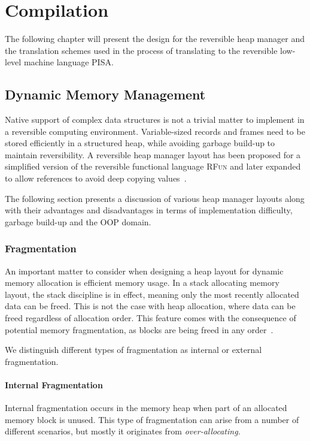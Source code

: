 \chapter{Compilation}
\label{chp:compilation}
The following chapter will present the design for the reversible heap manager and the translation schemes used in the process of translating \rooplpp to the reversible low-level machine language \textsc{PISA}.

\section{Dynamic Memory Management}
\label{sec:dynamic-memory-management}
Native support of complex data structures is not a trivial matter to implement in a reversible computing environment. Variable-sized records and frames need to be stored efficiently in a structured heap, while avoiding garbage build-up to maintain reversibility. A reversible heap manager layout has been proposed for a simplified version of the reversible functional language \textsc{RFun} and later expanded to allow references to avoid deep copying values~\cite{ha:heap, ty:rfun, tm:refcounting}.

The following section presents a discussion of various heap manager layouts along with their advantages and disadvantages in terms of implementation difficulty, garbage build-up and the OOP domain. 

\subsection{Fragmentation}
\label{subsec-fragmentation}
An important matter to consider when designing a heap layout for dynamic memory allocation is efficient memory usage. In a stack allocating memory layout, the stack discipline is in effect, meaning only the most recently allocated data can be freed. This is not the case with heap allocation, where data can be freed regardless of allocation order. This feature comes with the consequence of potential memory fragmentation, as blocks are being freed in any order~\cite{tm:languages}.

We distinguish different types of fragmentation as internal or external fragmentation.

\subsubsection{Internal Fragmentation}
Internal fragmentation occurs in the memory heap when part of an allocated memory block is unused. This type of fragmentation can arise from a number of different scenarios, but mostly it originates from \textit{over-allocating}. 

